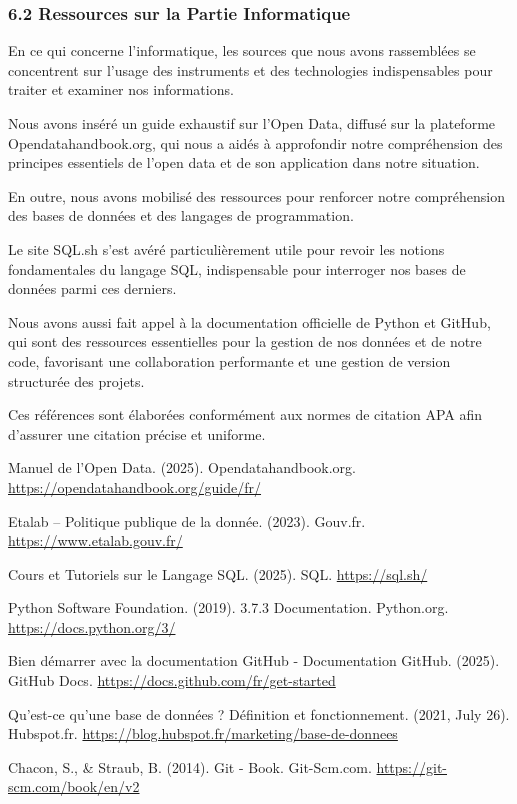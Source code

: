 \documentclass[
]{article}
\begin{document}
\subsubsection{6.2 Ressources sur la Partie
Informatique}\label{ressources-sur-la-partie-informatique}

En ce qui concerne l'informatique, les sources que nous avons
rassemblées se concentrent sur l'usage des instruments et des
technologies indispensables pour traiter et examiner nos informations.

Nous avons inséré un guide exhaustif sur l'Open Data, diffusé sur la
plateforme Opendatahandbook.org, qui nous a aidés à approfondir notre
compréhension des principes essentiels de l'open data et de son
application dans notre situation.

En outre, nous avons mobilisé des ressources pour renforcer notre
compréhension des bases de données et des langages de programmation.

Le site SQL.sh s'est avéré particulièrement utile pour revoir les
notions fondamentales du langage SQL, indispensable pour interroger nos
bases de données parmi ces derniers.

Nous avons aussi fait appel à la documentation officielle de Python et
GitHub, qui sont des ressources essentielles pour la gestion de nos
données et de notre code, favorisant une collaboration performante et
une gestion de version structurée des projets.

Ces références sont élaborées conformément aux normes de citation APA
afin d'assurer une citation précise et uniforme.

Manuel de l'Open Data. (2025). Opendatahandbook.org.
\url{https://opendatahandbook.org/guide/fr/}

Etalab -- Politique publique de la donnée. (2023). Gouv.fr.
\url{https://www.etalab.gouv.fr/}

Cours et Tutoriels sur le Langage SQL. (2025). SQL.
\url{https://sql.sh/}

Python Software Foundation. (2019). 3.7.3 Documentation. Python.org.
\url{https://docs.python.org/3/}

Bien démarrer avec la documentation GitHub - Documentation GitHub.
(2025). GitHub Docs. \url{https://docs.github.com/fr/get-started}

Qu'est-ce qu'une base de données ? Définition et fonctionnement. (2021,
July 26). Hubspot.fr.
\url{https://blog.hubspot.fr/marketing/base-de-donnees}

Chacon, S., \& Straub, B. (2014). Git - Book. Git-Scm.com.
\url{https://git-scm.com/book/en/v2}
\end{document}
